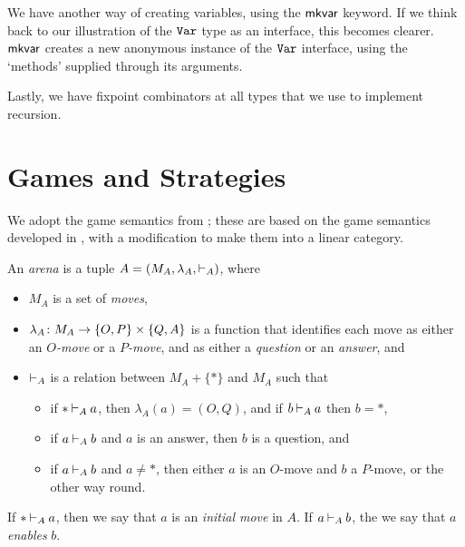 \documentclass[11pt]{report}
\begin{document}
We have another way of creating variables, using the $\mkvar$ keyword.  
If we think back to our illustration of the $\Var$ type as an interface, this becomes clearer.  
$\mkvar$ creates a new anonymous instance of the $\Var$ interface, using the `methods' supplied through its arguments.
\begin{mathpar}
\end{mathpar}

Lastly, we have fixpoint combinators at all types that we use to implement recursion.
\begin{mathpar}
\end{mathpar}

\section{Games and Strategies}

We adopt the game semantics from \cite{SamsonGuyIAActive}; these are based on the game semantics developed in \cite{hoPcf}, with a modification to make them into a linear category.

\begin{definition}
  An \emph{arena} is a tuple $A=(M_A,\lambda_A,\ts_A)$, where
  \begin{itemize}
    \item $M_A$ is a set of \emph{moves},
    \item $\lambda_A \from M_A \to \OP \times \QA$ is a function that identifies each move as either an \emph{$O$-move} or a \emph{$P$-move}, and as either a \emph{question} or an \emph{answer}, and
    \item $\ts_A$ is a relation between $M_A+\{*\}$ and $M_A$ such that
      \begin{itemize}
        \item if $*\ts_A a$, then $\lambda_A(a)=(O,Q)$, and if $b\ts_A a$ then $b=*$,
        \item if $a\ts_A b$ and $a$ is an answer, then $b$ is a question, and
        \item if $a \ts_A b$ and $a\ne *$, then either $a$ is an $O$-move and $b$ a $P$-move, or the other way round.
      \end{itemize}
  \end{itemize}
  If $*\ts_A a$, then we say that $a$ is an \emph{initial move} in $A$.  
  If $a \ts_A b$, the we say that $a$ \emph{enables} $b$.
\end{definition}
\end{document}
